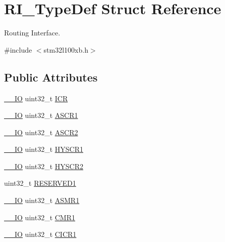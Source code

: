 \hypertarget{struct_r_i___type_def}{\section{R\-I\-\_\-\-Type\-Def Struct Reference}
\label{struct_r_i___type_def}
}


Routing Interface.  




{\ttfamily \#include $<$stm32l100xb.\-h$>$}

\subsection*{Public Attributes}
\begin{DoxyCompactItemize}
\item 
\hyperlink{core__sc300_8h_aec43007d9998a0a0e01faede4133d6be}{\-\_\-\-\_\-\-I\-O} uint32\-\_\-t \hyperlink{struct_r_i___type_def_adb5a93377d850e81160dc037c5995029}{I\-C\-R}
\item 
\hyperlink{core__sc300_8h_aec43007d9998a0a0e01faede4133d6be}{\-\_\-\-\_\-\-I\-O} uint32\-\_\-t \hyperlink{struct_r_i___type_def_a0e22b5b4cb660a876e185c9c2225f45f}{A\-S\-C\-R1}
\item 
\hyperlink{core__sc300_8h_aec43007d9998a0a0e01faede4133d6be}{\-\_\-\-\_\-\-I\-O} uint32\-\_\-t \hyperlink{struct_r_i___type_def_aeef72e9f5e1d864dde15d636219ac58d}{A\-S\-C\-R2}
\item 
\hyperlink{core__sc300_8h_aec43007d9998a0a0e01faede4133d6be}{\-\_\-\-\_\-\-I\-O} uint32\-\_\-t \hyperlink{struct_r_i___type_def_a807f9b63b7cb1357354fb8f7e07bfbb0}{H\-Y\-S\-C\-R1}
\item 
\hyperlink{core__sc300_8h_aec43007d9998a0a0e01faede4133d6be}{\-\_\-\-\_\-\-I\-O} uint32\-\_\-t \hyperlink{struct_r_i___type_def_a2b8a23d4df42b1d0ca4d902e1f13a61d}{H\-Y\-S\-C\-R2}
\item 
uint32\-\_\-t \hyperlink{struct_r_i___type_def_a1335591e16918824ef985bfd525084ad}{R\-E\-S\-E\-R\-V\-E\-D1}
\item 
\hyperlink{core__sc300_8h_aec43007d9998a0a0e01faede4133d6be}{\-\_\-\-\_\-\-I\-O} uint32\-\_\-t \hyperlink{struct_r_i___type_def_a4063fdb02d5f7c244eebacfb5ece688b}{A\-S\-M\-R1}
\item 
\hyperlink{core__sc300_8h_aec43007d9998a0a0e01faede4133d6be}{\-\_\-\-\_\-\-I\-O} uint32\-\_\-t \hyperlink{struct_r_i___type_def_ae81ea65b0b1754359eb5255746373440}{C\-M\-R1}
\item 
\hyperlink{core__sc300_8h_aec43007d9998a0a0e01faede4133d6be}{\-\_\-\-\_\-\-I\-O} uint32\-\_\-t \hyperlink{struct_r_i___type_def_adb8dc783b491b761709af5dccadc146c}{C\-I\-C\-R1}

\end{DoxyCompactItemize}
